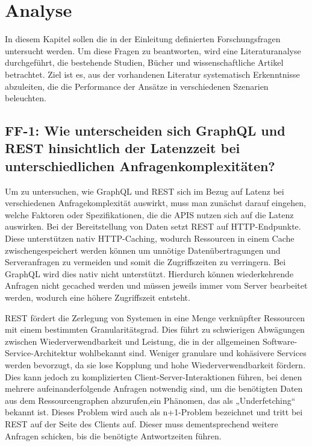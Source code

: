 \chapter{Analyse} %
\label{sec:analyse}
In diesem Kapitel sollen die in der Einleitung definierten Forschungsfragen untersucht werden. Um diese Fragen zu beantworten, wird eine Literaturanalyse durchgeführt, die bestehende Studien, Bücher und wissenschaftliche Artikel betrachtet. Ziel ist es, aus der vorhandenen Literatur systematisch Erkenntnisse abzuleiten, die die Performance der Ansätze in verschiedenen Szenarien beleuchten.

\section{FF-1: Wie unterscheiden sich GraphQL und REST hinsichtlich der Latenzzeit bei unterschiedlichen Anfragenkomplexitäten?} %
\label{sec:ff1}
Um zu untersuchen, wie GraphQL und REST sich im Bezug auf Latenz bei verschiedenen Anfragekomplexität auswirkt, muss man zunächst darauf eingehen, welche Faktoren oder Spezifikationen, die die APIS nutzen sich auf die Latenz auswirken.
Bei der Bereitstellung von Daten setzt REST auf HTTP-Endpunkte. Diese unterstützen nativ HTTP-Caching,  wodurch Ressourcen in einem Cache zwischengespeichert werden können um unnötige Datenübertragungen und Serveranfragen zu vermeiden und somit die Zugriffszeiten zu verringern.
Bei GraphQL wird dies nativ nicht unterstützt. Hierdurch können wiederkehrende Anfragen nicht gecached werden und müssen jeweils immer vom Server bearbeitet werden, wodurch eine höhere Zugriffszeit entsteht. \citep{graphqlreplacerest}

\noindent
REST fördert die Zerlegung von Systemen in eine Menge verknüpfter Ressourcen mit einem bestimmten Granularitätsgrad. Dies führt zu schwierigen Abwägungen zwischen Wiederverwendbarkeit und Leistung, die in der allgemeinen Software-Service-Architektur wohlbekannt sind. Weniger granulare und kohäsivere Services werden bevorzugt, da sie lose Kopplung und hohe Wiederverwendbarkeit fördern. Dies kann jedoch zu komplizierten Client-Server-Interaktionen führen, bei denen mehrere aufeinanderfolgende Anfragen notwendig sind, um die benötigten Daten aus dem Ressourcengraphen abzurufen,ein Phänomen, das als „Underfetching“ bekannt ist. Dieses Problem wird auch als n+1-Problem bezeichnet und tritt bei REST auf der Seite des Clients auf. Dieser muss dementsprechend weitere Anfragen schicken, bis die benötigte Antwortzeiten führen. \citep{graphqlhealth} \citep{migrategraphql}

